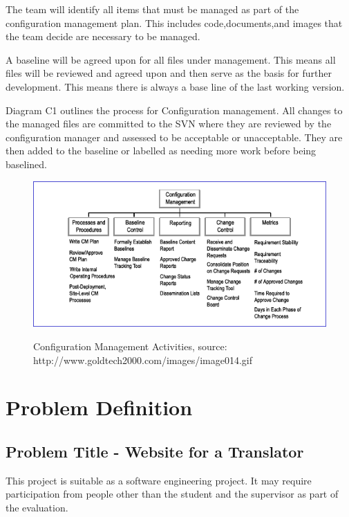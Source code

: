 \documentclass{l3proj}
\begin{document}
The team will identify all items that must be managed as part of the configuration management plan.
This includes code,documents,and images that the team decide are necessary to be managed.

A baseline will be agreed upon for all files under management. This means all files will be reviewed and
agreed upon and then serve as the basis for further development. This means there is always a base line
of the last working version.

Diagram C1 outlines the process for Configuration management. 
All changes to the managed files are committed to the SVN where they are reviewed by the configuration
manager and assessed to be acceptable or unacceptable. They are then added to the baseline or labelled
as needing more work before being baselined.

\begin{figure}
\begin{center}
\label{fig:configman}
\includegraphics[scale=0.6]{config}
\caption{\small{Configuration Management Activities, source: http://www.goldtech2000.com/images/image014.gif}}
\end{center}
\end{figure}


\chapter{Problem Definition}
\label{chap:prob-spec}
\section{Problem Title - Website for a Translator}

This project is suitable as a software engineering project. It may require participation from people
other than the student and the supervisor as part of the evaluation.
\end{document}
